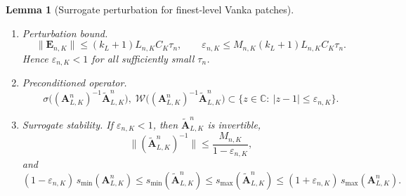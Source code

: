 \documentclass[10pt,a4paper]{amsart}
\newtheorem{lemma}{Lemma}
\begin{document}
\begin{lemma}[Surrogate perturbation for finest-level Vanka patches]
\begin{enumerate}[label=(\alph*),leftmargin=*,itemsep=2pt,topsep=2pt,parsep=0pt]
\item \emph{Perturbation bound.}
\begin{equation}\label{eq:patch-perturbation-bound}
  \|\bm E_{n,K}\|
  \le (k_L+1)L_{n,K}C_K\tau_n,
  \qquad
  \varepsilon_{n,K}
  \le M_{n,K}(k_L+1)L_{n,K}C_K\tau_n.
\end{equation}
Hence \(\varepsilon_{n,K}<1\) for all sufficiently small \(\tau_n\).

\item \emph{Preconditioned operator.}
\begin{equation}\label{eq:patch-spectrum-fov}
  \sigma\!\bigl((\bm A_{L,K}^n)^{-1}\tilde{\bm A}_{L,K}^n\bigr),\;
  \mathcal W\!\bigl((\bm A_{L,K}^n)^{-1}\tilde{\bm A}_{L,K}^n\bigr)
  \subset
  \{z\in\mathbb C:\ |z-1|\le \varepsilon_{n,K}\}.
\end{equation}

\item \emph{Surrogate stability.}
If \(\varepsilon_{n,K}<1\), then \(\tilde{\bm A}_{L,K}^n\) is invertible,
\begin{equation}\label{eq:patch-inverse-bound}
  \|(\tilde{\bm A}_{L,K}^n)^{-1}\|
  \le \frac{M_{n,K}}{1-\varepsilon_{n,K}},
\end{equation}
and
\begin{equation}\label{eq:patch-sv-bounds}
  (1-\varepsilon_{n,K})\,s_{\min}(\bm A_{L,K}^n)
  \le s_{\min}(\tilde{\bm A}_{L,K}^n)
  \le s_{\max}(\tilde{\bm A}_{L,K}^n)
  \le (1+\varepsilon_{n,K})\,s_{\max}(\bm A_{L,K}^n).
\end{equation}
\end{enumerate}
\end{lemma}
\end{document}

